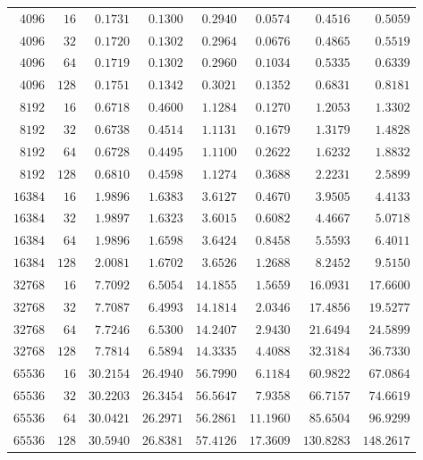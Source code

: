 \begin{tabular}{rrrrrrrr}
${4096}$ & ${16}$ & $0.1731$ & $0.1300$ & $0.2940$ & $0.0574$ & $0.4516$ & $0.5059$ \\
${4096}$ & ${32}$ & $0.1720$ & $0.1302$ & $0.2964$ & $0.0676$ & $0.4865$ & $0.5519$ \\
${4096}$ & ${64}$ & $0.1719$ & $0.1302$ & $0.2960$ & $0.1034$ & $0.5335$ & $0.6339$ \\
${4096}$ & ${128}$ & $0.1751$ & $0.1342$ & $0.3021$ & $0.1352$ & $0.6831$ & $0.8181$ \\
${8192}$ & ${16}$ & $0.6718$ & $0.4600$ & $1.1284$ & $0.1270$ & $1.2053$ & $1.3302$ \\
${8192}$ & ${32}$ & $0.6738$ & $0.4514$ & $1.1131$ & $0.1679$ & $1.3179$ & $1.4828$ \\
${8192}$ & ${64}$ & $0.6728$ & $0.4495$ & $1.1100$ & $0.2622$ & $1.6232$ & $1.8832$ \\
${8192}$ & ${128}$ & $0.6810$ & $0.4598$ & $1.1274$ & $0.3688$ & $2.2231$ & $2.5899$ \\
${16384}$ & ${16}$ & $1.9896$ & $1.6383$ & $3.6127$ & $0.4670$ & $3.9505$ & $4.4133$ \\
${16384}$ & ${32}$ & $1.9897$ & $1.6323$ & $3.6015$ & $0.6082$ & $4.4667$ & $5.0718$ \\
${16384}$ & ${64}$ & $1.9896$ & $1.6598$ & $3.6424$ & $0.8458$ & $5.5593$ & $6.4011$ \\
${16384}$ & ${128}$ & $2.0081$ & $1.6702$ & $3.6526$ & $1.2688$ & $8.2452$ & $9.5150$ \\
${32768}$ & ${16}$ & $7.7092$ & $6.5054$ & $14.1855$ & $1.5659$ & $16.0931$ & $17.6600$ \\
${32768}$ & ${32}$ & $7.7087$ & $6.4993$ & $14.1814$ & $2.0346$ & $17.4856$ & $19.5277$ \\
${32768}$ & ${64}$ & $7.7246$ & $6.5300$ & $14.2407$ & $2.9430$ & $21.6494$ & $24.5899$ \\
${32768}$ & ${128}$ & $7.7814$ & $6.5894$ & $14.3335$ & $4.4088$ & $32.3184$ & $36.7330$ \\
${65536}$ & ${16}$ & $30.2154$ & $26.4940$ & $56.7990$ & $6.1184$ & $60.9822$ & $67.0864$ \\
${65536}$ & ${32}$ & $30.2203$ & $26.3454$ & $56.5647$ & $7.9358$ & $66.7157$ & $74.6619$ \\
${65536}$ & ${64}$ & $30.0421$ & $26.2971$ & $56.2861$ & $11.1960$ & $85.6504$ & $96.9299$ \\
${65536}$ & ${128}$ & $30.5940$ & $26.8381$ & $57.4126$ & $17.3609$ & $130.8283$ & $148.2617$ \\
\bottomrule
\end{tabular}
